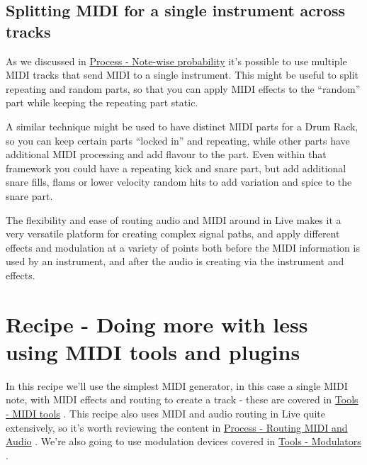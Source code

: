 \documentclass[
  12pt,
  letterpaper,
  oneside,
  open=any]{scrbook}
\begin{document}
\section{Splitting MIDI for a single instrument across
tracks}\label{splitting-midi-for-a-single-instrument-across-tracks}

As we discussed in
\hyperref[Chapter-002-Process-Note_wise_probability]{Process - Note-wise
probability} it's possible to use multiple MIDI tracks that send MIDI to
a single instrument. This might be useful to split repeating and random
parts, so that you can apply MIDI effects to the ``random'' part while
keeping the repeating part static.

A similar technique might be used to have distinct MIDI parts for a Drum
Rack, so you can keep certain parts ``locked in'' and repeating, while
other parts have additional MIDI processing and add flavour to the part.
Even within that framework you could have a repeating kick and snare
part, but add additional snare fills, flams or lower velocity random
hits to add variation and spice to the snare part.

The flexibility and ease of routing audio and MIDI around in Live makes
it a very versatile platform for creating complex signal paths, and
apply different effects and modulation at a variety of points both
before the MIDI information is used by an instrument, and after the
audio is creating via the instrument and effects.


\chapter{Recipe - Doing more with less using MIDI tools and
plugins}\label{Chapter-006-Recipe-MIDI_tools}

In this recipe we'll use the simplest MIDI generator, in this case a
single MIDI note, with MIDI effects and routing to create a track -
these are covered in \hyperref[Chapter-004-Tools-MIDI_tools]{Tools -
MIDI tools} . This recipe also uses MIDI and audio routing in Live quite
extensively, so it's worth reviewing the content in
\hyperref[Chapter-005-Process-Routing]{Process - Routing MIDI and Audio}
. We're also going to use modulation devices covered in
\hyperref[Chapter-007-Tools-Modulators]{Tools - Modulators} .
\end{document}
